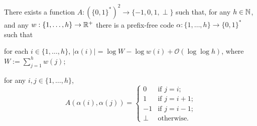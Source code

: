\documentclass[kpfonts]{patmorin}
\newcommand{\Oh}{\mathcal{O}}
\begin{document}
\begin{lem}
  There exists a function $A:(\{0,1\}^*)^2\to\{-1,0,1,\perp\}$ such that, for any $h\in\mathbb{N}$, and any $w:\{1,\dots,h\}\to\mathbb{R}^+$ there is a prefix-free code $\alpha:\{1,\dots,h\}\to \{0,1\}^*$ such that
  \begin{compactenum}
    \item for each $i\in\{1,\dots,h\}$, $|\alpha(i)|=\log W -\log w(i) + \Oh(\log\log h)$, where $W:=\sum_{j=1}^h w(j)$;
    \item for any $i,j\in\{1,\dots,h\}$,
    \[   A(\alpha(i),\alpha(j))
    = \begin{cases}
       0 & \text{if $j=i$;}\\
       1 & \text{if $j=i+1$;} \\
       -1 & \text{if $j=i-1$;} \\
       \perp & \text{otherwise.}
      \end{cases}
      \]
    \end{compactenum}
\end{lem}
\end{document}
